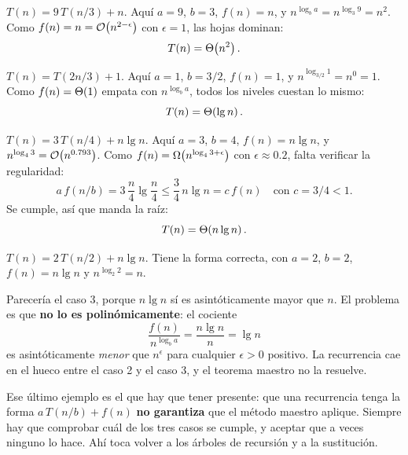 \documentclass[11pt,letterpaper]{article}
\begin{document}
\begin{ejemplo}[Caso 1]
  $T(n) = 9\,T(n/3) + n$. Aquí $a = 9$, $b = 3$, $f(n) = n$, y
  $n^{\log_b a} = n^{\log_3 9} = n^2$. Como
  $f(n) = n = \mathcal{O}\!\left(n^{2 - \epsilon}\right)$ con $\epsilon = 1$, las hojas
  dominan:
  \[
      T(n) = \Theta\!\left(n^2\right) .
  \]
\end{ejemplo}

\begin{ejemplo}[Caso 2]
  $T(n) = T(2n/3) + 1$. Aquí $a = 1$, $b = 3/2$, $f(n) = 1$, y
  $n^{\log_{3/2} 1} = n^0 = 1$. Como $f(n) = \Theta\!\left(1\right)$ empata con
  $n^{\log_b a}$, todos los niveles cuestan lo mismo:
  \[
      T(n) = \Theta\!\left(\lg n\right) .
  \]
\end{ejemplo}

\begin{ejemplo}[Caso 3]
  $T(n) = 3\,T(n/4) + n \lg n$. Aquí $a = 3$, $b = 4$,
  $f(n) = n \lg n$, y
  $n^{\log_4 3} = \mathcal{O}\!\left(n^{0.793}\right)$. Como
  $f(n) = \Omega\!\left(n^{\log_4 3 + \epsilon}\right)$ con
  $\epsilon \approx 0.2$, falta verificar la regularidad:
  \[
      a\,f(n/b) = 3\,\frac{n}{4}\lg\frac{n}{4}
      \leq \frac{3}{4}\,n \lg n = c\,f(n)
      \quad \text{con } c = 3/4 < 1 .
  \]
  Se cumple, así que manda la raíz:
  \[
      T(n) = \Theta\!\left(n \lg n\right) .
  \]
\end{ejemplo}

\begin{ejemplo}
  $T(n) = 2\,T(n/2) + n \lg n$. Tiene la forma correcta, con $a = 2$,
  $b = 2$, $f(n) = n \lg n$ y $n^{\log_2 2} = n$.

  Parecería el caso 3, porque $n \lg n$ sí es asintóticamente mayor
  que $n$. El problema es que \textbf{no lo es polinómicamente}: el
  cociente
  \[
      \frac{f(n)}{n^{\log_b a}} = \frac{n \lg n}{n} = \lg n
  \]
  es asintóticamente \emph{menor} que $n^{\epsilon}$ para cualquier
  $\epsilon > 0$ positivo. La recurrencia cae en el hueco entre el
  caso 2 y el caso 3, y el teorema maestro no la resuelve.
\end{ejemplo}

\begin{ojo}
  Ese último ejemplo es el que hay que tener presente: que una
  recurrencia tenga la forma $a\,T(n/b) + f(n)$ \textbf{no garantiza}
  que el método maestro aplique. Siempre hay que comprobar cuál de los
  tres casos se cumple, y aceptar que a veces ninguno lo hace. Ahí
  toca volver a los árboles de recursión y a la sustitución.
\end{ojo}

\end{document}
